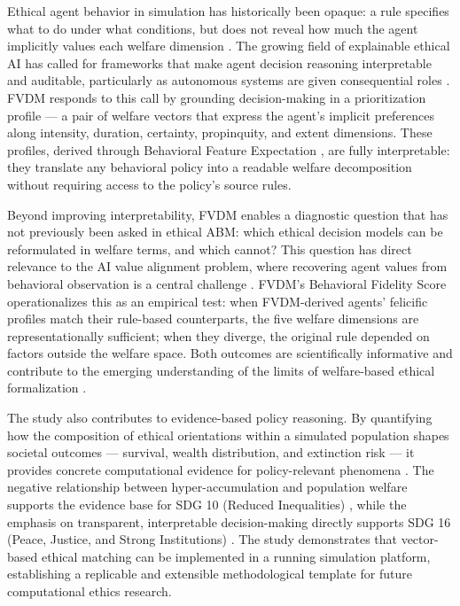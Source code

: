 \documentclass{icsthesis}
\begin{document}
\begin{mainmatter}
Ethical agent behavior in simulation has historically been opaque: a rule specifies what to do under what conditions, but does not reveal how much the agent implicitly values each welfare dimension \citep{Kang2025, TimmonsByrne2018}. The growing field of explainable ethical AI has called for frameworks that make agent decision reasoning interpretable and auditable, particularly as autonomous systems are given consequential roles \citep{Bontempi2025, doi:10.1177/29498732251377351}. FVDM responds to this call by grounding decision-making in a prioritization profile --- a pair of welfare vectors that express the agent's implicit preferences along intensity, duration, certainty, propinquity, and extent dimensions. These profiles, derived through Behavioral Feature Expectation \citep{AbbeelNg2004}, are fully interpretable: they translate any behavioral policy into a readable welfare decomposition without requiring access to the policy's source rules.

Beyond improving interpretability, FVDM enables a diagnostic question that has not previously been asked in ethical ABM: which ethical decision models can be reformulated in welfare terms, and which cannot? This question has direct relevance to the AI value alignment problem, where recovering agent values from behavioral observation is a central challenge \citep{Bostrom2014, AbbeelNg2004}. FVDM's Behavioral Fidelity Score operationalizes this as an empirical test: when FVDM-derived agents' felicific profiles match their rule-based counterparts, the five welfare dimensions are representationally sufficient; when they diverge, the original rule depended on factors outside the welfare space. Both outcomes are scientifically informative and contribute to the emerging understanding of the limits of welfare-based ethical formalization \citep{Baujard2009, Munda2020}.

The study also contributes to evidence-based policy reasoning. By quantifying how the composition of ethical orientations within a simulated population shapes societal outcomes --- survival, wealth distribution, and extinction risk --- it provides concrete computational evidence for policy-relevant phenomena \citep{Tolk2022, Lempert2002}. The negative relationship between hyper-accumulation and population welfare supports the evidence base for SDG 10 (Reduced Inequalities) \citep{UNSDG10}, while the emphasis on transparent, interpretable decision-making directly supports SDG 16 (Peace, Justice, and Strong Institutions) \citep{UNSDG16}. The study demonstrates that vector-based ethical matching can be implemented in a running simulation platform, establishing a replicable and extensible methodological template for future computational ethics research.


\end{mainmatter}
\end{document}
